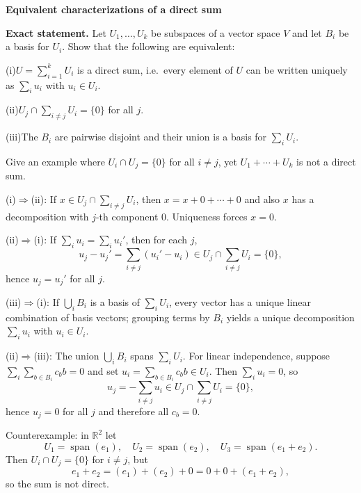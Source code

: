 \begin{problem}[CP-I-0104]
\label{prob:cp-i-0104}
\textbf{Equivalent characterizations of a direct sum}

\textbf{Exact statement.}
\hspace*{1.5em}Let $U_1,\dots,U_k$ be subspaces of a vector space $V$ and let $B_i$ be a basis for $U_i$.
Show that the following are equivalent:

	\par\noindent (i)\quad $U=\sum_{i=1}^k U_i$ is a direct sum, i.e.\ every element of $U$ can be written uniquely as $\sum_i u_i$ with $u_i\in U_i$.
	\par\noindent (ii)\quad $U_j\cap \sum_{i\ne j}U_i=\{0\}$ for all $j$.
	\par\noindent (iii)\quad The $B_i$ are pairwise disjoint and their union is a basis for $\sum_i U_i$.

Give an example where $U_i\cap U_j=\{0\}$ for all $i\ne j$, yet $U_1+\cdots+U_k$ is not a direct sum.
\end{problem}

\begin{solution}
(i)$\Rightarrow$(ii): If $x\in U_j\cap\sum_{i\ne j}U_i$, then $x=x+0+\cdots+0$ and also $x$ has a decomposition with
$j$-th component $0$. Uniqueness forces $x=0$.

(ii)$\Rightarrow$(i): If $\sum_i u_i=\sum_i u_i'$, then for each $j$,
\[
u_j-u_j'=\sum_{i\ne j}(u_i'-u_i)\in U_j\cap\sum_{i\ne j}U_i=\{0\},
\]
hence $u_j=u_j'$ for all $j$.

(iii)$\Rightarrow$(i): If $\bigcup_i B_i$ is a basis of $\sum_i U_i$, every vector has a unique linear combination of basis
vectors; grouping terms by $B_i$ yields a unique decomposition $\sum_i u_i$ with $u_i\in U_i$.

(ii)$\Rightarrow$(iii): The union $\bigcup_i B_i$ spans $\sum_i U_i$. For linear independence, suppose
$\sum_i \sum_{b\in B_i} c_b b=0$ and set $u_i=\sum_{b\in B_i} c_b b\in U_i$. Then $\sum_i u_i=0$, so
\[
u_j=-\sum_{i\ne j}u_i\in U_j\cap\sum_{i\ne j}U_i=\{0\},
\]
hence $u_j=0$ for all $j$ and therefore all $c_b=0$.

Counterexample: in $\mathbb R^2$ let
\[
U_1=\operatorname{span}(e_1),\quad U_2=\operatorname{span}(e_2),\quad U_3=\operatorname{span}(e_1+e_2).
\]
Then $U_i\cap U_j=\{0\}$ for $i\ne j$, but
\[
e_1+e_2=(e_1)+(e_2)+0=0+0+(e_1+e_2),
\]
so the sum is not direct.

\bigskip
\end{solution}

